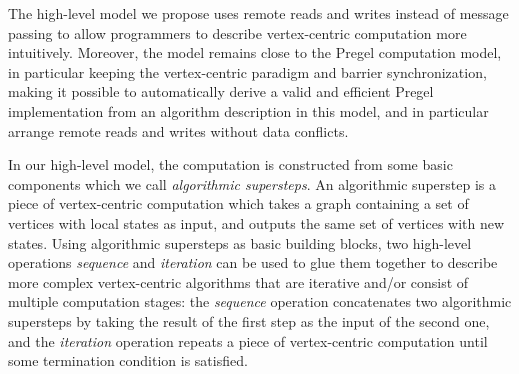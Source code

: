 \documentclass{sokendai_thesis} %
\begin{document}

The high-level model we propose uses remote reads and writes instead of message passing to allow programmers to describe vertex-centric computation more intuitively. %
Moreover, the model remains close to the Pregel computation model, in particular keeping the vertex-centric paradigm and barrier synchronization, making it possible to automatically derive a valid and efficient Pregel implementation from an algorithm description in this model, and in particular arrange remote reads and writes without data conflicts.


In our high-level model, the computation is constructed from some basic components which we call \emph{algorithmic supersteps}.
An algorithmic superstep is a piece of vertex-centric computation which takes a graph containing a set of vertices with local states as input, and outputs the same set of vertices with new states.
Using algorithmic supersteps as basic building blocks, two high-level operations \emph{sequence} and \emph{iteration} can be used to glue them together to describe more complex vertex-centric algorithms that are iterative and/or consist of multiple computation stages:
the \emph{sequence} operation concatenates two algorithmic supersteps by taking the result of the first step as the input of the second one, and the \emph{iteration} operation repeats a piece of vertex-centric computation until some termination condition is satisfied.
\end{document}
